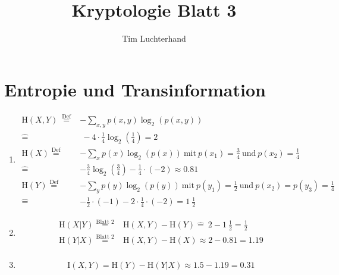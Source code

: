 \documentclass[DIN, pagenumber=false, fontsize=11pt, parskip=half]{scrartcl}
\title{Kryptologie Blatt 3}
\author{Tim Luchterhand}
\newcommand{\Ent}{\text{H}}
\newcommand{\MI}{\text{I}}
\begin{document}
    \maketitle
    \setcounter{section}{2}
    \section{Entropie und Transinformation}
    \begin{enumerate}[label=\alph*)]
        \item 
        \begin{align*}
            \Ent(X, Y) ~\stackrel{\text{Def}}{=}& -\sum_{x, y}{p(x, y) \log_2\left(p(x, y)\right)} \\
            \hat{=}& ~-4 \cdot \frac{1}{4} \log_2\left(\frac{1}{4}\right) = 2 \\
            \Ent(X) \stackrel{\text{Def}}{=}& -\sum_x{p(x) \log_2\left(p(x)\right)} \ \text{mit} \ p(x_1) = \frac{3}{4} \ \text{und}
            \ p(x_2) = \frac{1}{4} \\
            \hat{=}& -\frac{3}{4} \log_2\left(\frac{3}{4}\right) - \frac{1}{4} \cdot (-2) \approx 0.81 \\
            \Ent(Y) \stackrel{\text{Def}}{=}& -\sum_y{p(y) \log_2\left(p(y)\right)} \ \text{mit} \ p(y_1) = \frac{1}{2} \ \text{und}
            \ p(x_2) = p(y_3) = \frac{1}{4} \\
            \hat{=}& - \frac{1}{2} \cdot (-1) - 2 \cdot \frac{1}{4} \cdot (-2) = 1 \ \frac{1}{2}
        \end{align*}
        \item 
        \begin{align*}
            \Ent(X|Y) \stackrel{\text{Blatt 2}}{=}& \Ent(X, Y) - \Ent(Y) \hat{=} \ 2 - 1 \ \frac{1}{2} = \frac{1}{2} \\
            \Ent(Y|X) \stackrel{\text{Blatt 2}}{=}& \Ent(X, Y) - \Ent(X) \approx 2 - 0.81 = 1.19\\
        \end{align*}
        \item 
        \begin{equation*}
            \MI(X, Y) = \Ent(Y) - \Ent(Y|X) \approx 1.5 - 1.19 = 0.31
        \end{equation*}
    \end{enumerate}
\end{document}
